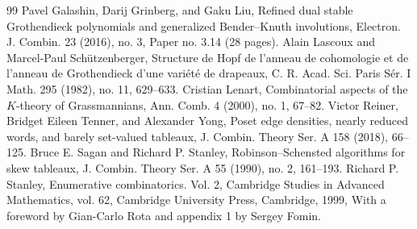 \documentclass[11pt]{article}
\theoremstyle{definition}
\begin{document}
\begin{thebibliography}{99}
 Pavel Galashin, Darij Grinberg, and Gaku Liu, Refined dual stable Grothendieck polynomials and generalized Bender--Knuth involutions, Electron. J. Combin. 23 (2016), no. 3, Paper no. 3.14 (28 pages).
 Alain Lascoux and Marcel-Paul Sch\"utzenberger, Structure de Hopf de l\textquoteright anneau de cohomologie et de l\textquoteright anneau de Grothendieck d\textquoteright une vari\'et\'e de drapeaux, C. R. Acad. Sci. Paris S\'er. I Math. 295 (1982), no. 11, 629--633.
 Cristian Lenart, Combinatorial aspects of the $K$-theory of Grassmannians, Ann. Comb. 4 (2000), no. 1, 67--82.
 Victor Reiner, Bridget Eileen Tenner, and Alexander Yong, Poset edge densities, nearly reduced words, and barely set-valued tableaux, J. Combin. Theory Ser. A 158 (2018), 66--125.
 Bruce E. Sagan and Richard P. Stanley, Robinson--Schensted algorithms for skew tableaux, J. Combin. Theory Ser. A 55 (1990), no. 2, 161--193.
 Richard P. Stanley, Enumerative combinatorics. Vol. 2, Cambridge Studies in Advanced Mathematics, vol. 62, Cambridge University Press, Cambridge, 1999, With a foreword by Gian-Carlo Rota and appendix 1 by Sergey Fomin.
\end{thebibliography}
\end{document}
